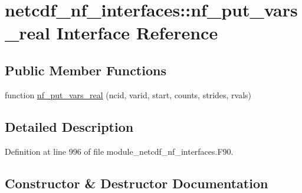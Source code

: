 \hypertarget{interfacenetcdf__nf__interfaces_1_1nf__put__vars__real}{}\section{netcdf\+\_\+nf\+\_\+interfaces\+:\+:nf\+\_\+put\+\_\+vars\+\_\+real Interface Reference}
\label{interfacenetcdf__nf__interfaces_1_1nf__put__vars__real}
\subsection*{Public Member Functions}
\begin{DoxyCompactItemize}
\item 
function \hyperlink{interfacenetcdf__nf__interfaces_1_1nf__put__vars__real_a979eae08a86883fad8533bbecabd550d}{nf\+\_\+put\+\_\+vars\+\_\+real} (ncid, varid, start, counts, strides, rvals)
\end{DoxyCompactItemize}


\subsection{Detailed Description}


Definition at line 996 of file module\+\_\+netcdf\+\_\+nf\+\_\+interfaces.\+F90.



\subsection{Constructor \& Destructor Documentation}
\mbox{\label{interfacenetcdf__nf__interfaces_1_1nf__put__vars__real_a979eae08a86883fad8533bbecabd550d}} 
